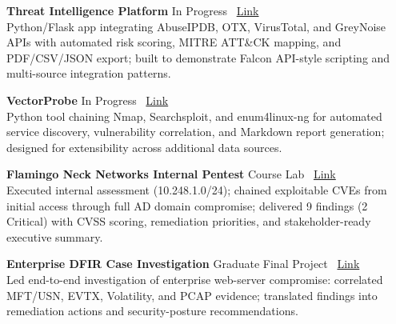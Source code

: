 \documentclass{resume2}
\begin{document}
\textbf{Threat Intelligence Platform} \hfill In Progress \textbar\ \href{https://github.com/kismatkunwar89/threat-intelligence-platform}{Link}\\
Python/Flask app integrating AbuseIPDB, OTX, VirusTotal, and GreyNoise APIs with automated risk scoring, MITRE ATT\&CK mapping, and PDF/CSV/JSON export; built to demonstrate Falcon API-style scripting and multi-source integration patterns.

\smallskip
\textbf{VectorProbe} \hfill In Progress \textbar\ \href{https://github.com/kismatkunwar89/VectorProbe}{Link}\\
Python tool chaining Nmap, Searchsploit, and enum4linux-ng for automated service discovery, vulnerability correlation, and Markdown report generation; designed for extensibility across additional data sources.

\smallskip
\textbf{Flamingo Neck Networks Internal Pentest} \hfill Course Lab \textbar\ \href{https://kismatkunwar89.github.io/portfolio/flamingo-report/lab5final.pdf}{Link}\\
Executed internal assessment (10.248.1.0/24); chained exploitable CVEs from initial access through full AD domain compromise; delivered 9 findings (2 Critical) with CVSS scoring, remediation priorities, and stakeholder-ready executive summary.

\smallskip
\textbf{Enterprise DFIR Case Investigation} \hfill Graduate Final Project \textbar\ \href{https://kismatkunwar89.github.io/portfolio/dfir-final.html}{Link}\\
Led end-to-end investigation of enterprise web-server compromise: correlated MFT/USN, EVTX, Volatility, and PCAP evidence; translated findings into remediation actions and security-posture recommendations.
\end{document}
